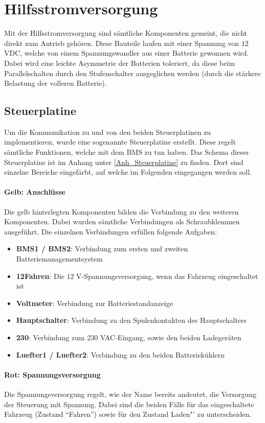 \section{Hilfsstromversorgung}
Mit der Hilfsstromversorgung sind sämtliche Komponenten gemeint, die nicht direkt zum Antrieb gehören. Diese Bauteile laufen mit einer Spannung von $12$ VDC, welche von einem Spannungswandler aus einer Batterie gewonnen wird. Dabei wird eine leichte Asymmetrie der Batterien toleriert, da diese beim Parallelschalten durch den Stufenschalter ausgeglichen werden (durch die stärkere Belastung der volleren Batterie).

\subsection{Steuerplatine} \label{steuerplatine}
Um die Kommunikation zu und von den beiden Steuerplatinen zu implementieren, wurde eine sogenannte Steuerplatine erstellt. Diese regelt sämtliche Funktionen, welche mit dem BMS zu tun haben. Das Schema dieser Steuerplatine ist im Anhang unter \ref{Anh_Steuerplatine} zu finden. Dort sind einzelne Bereiche eingefärbt, auf welche im Folgenden eingegangen werden soll.

\paragraph{Gelb: Anschlüsse}
Die gelb hinterlegten Komponenten bilden die Verbindung zu den weiteren Komponenten. Dabei wurden sämtliche Verbindungen als Schraubklemmen ausgeführt. Die einzelnen Verbindungen erfüllen folgende Aufgaben: \begin{itemize}
	\item \textbf{BMS1 / BMS2}: Verbindung zum ersten und zweiten Batteriemanagementsystem
	\item \textbf{12Fahren}: Die $12$ V-Spannungsversorgung, wenn das Fahrzeug eingeschaltet ist
	\item \textbf{Voltmeter}: Verbindung zur Batteriestandanzeige
	\item \textbf{Hauptschalter}: Verbindung zu den Spulenkontakten des Hauptschalters
	\item \textbf{230}: Verbindung zum $230$ VAC-Eingang, sowie den beiden Ladegeräten
	\item \textbf{Luefter1 / Luefter2}: Verbindung zu den beiden Batteriekühlern
\end{itemize}

\paragraph{Rot: Spannungsversorgung}
Die Spannungsversorgung regelt, wie der Name bereits andeutet, die Versorgung der Steuerung mit Spannung. Dabei sind die beiden Fälle für das eingeschaltete Fahrzeug (Zustand "`Fahren"') sowie für den Zustand \grqq Laden"' zu unterscheiden.

